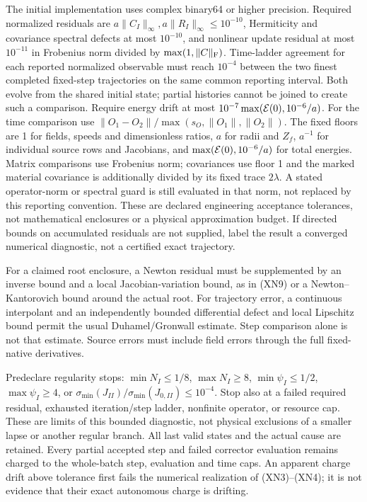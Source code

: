 \documentclass[11pt]{article}
\begin{document}
The initial implementation uses complex binary64 or higher
precision.  Required normalized residuals are $a\|C_I\|_\infty,
a\|R_I\|_\infty\leq10^{-10}$, Hermiticity and covariance spectral
defects at most $10^{-10}$, and nonlinear update residual at most
$10^{-11}$ in Frobenius norm divided by
$\max(1,\|C\|_{\rm F})$.  Time-ladder agreement for each reported
normalized observable must reach $10^{-4}$ between the two finest
completed fixed-step trajectories on the same common reporting
interval.  Both evolve from the shared initial state; partial
histories cannot be joined to create such a comparison.
Require energy drift at most
$10^{-7}\max({\cal E}(0),10^{-6}/a)$.
For the time comparison use
$\|O_1-O_2\|/\max(s_O,\|O_1\|,\|O_2\|)$.
The fixed floors are 1 for fields, speeds and dimensionless
ratios, $a$ for radii and $Z_f$, $a^{-1}$ for individual source
rows and Jacobians, and $\max({\cal E}(0),10^{-6}/a)$ for total
energies.  Matrix comparisons use Frobenius norm; covariances
use floor 1 and the marked material covariance is additionally
divided by its fixed trace $2\lambda$.  A stated operator-norm
or spectral guard is still evaluated in that norm, not replaced
by this reporting convention.
These are declared engineering acceptance tolerances, not
mathematical enclosures or a physical approximation budget.
If directed bounds on accumulated residuals are not supplied,
label the result a converged numerical diagnostic, not a
certified exact trajectory.

For a claimed root enclosure, a Newton residual must be supplemented
by an inverse bound and a local Jacobian-variation bound, as in
(XN9) or a Newton--Kantorovich bound around the actual root.
For trajectory error, a continuous interpolant and an independently
bounded differential defect and local Lipschitz bound permit the
usual Duhamel/Gronwall estimate.  Step comparison alone is not
that estimate.  Source errors must include field errors through
the full fixed-native derivatives.

Predeclare regularity stops: $\min N_I\leq1/8$, $\max N_I\geq8$,
$\min\psi_I\leq1/2$, $\max\psi_I\geq4$, or
$\sigma_{\min}(J_{II})/\sigma_{\min}(J_{0,II})\leq10^{-4}$.
Stop also at a failed required residual, exhausted iteration/step
ladder, nonfinite operator, or resource cap.  These are limits of
this bounded diagnostic, not physical exclusions of a smaller
lapse or another regular branch.  All last valid states and the
actual cause are retained.  Every partial accepted step and
failed corrector evaluation remains charged to the whole-batch
step, evaluation and time caps.  An apparent charge drift above
tolerance first fails the numerical realization of (XN3)--(XN4);
it is not evidence that their exact autonomous charge is drifting.
\end{document}
